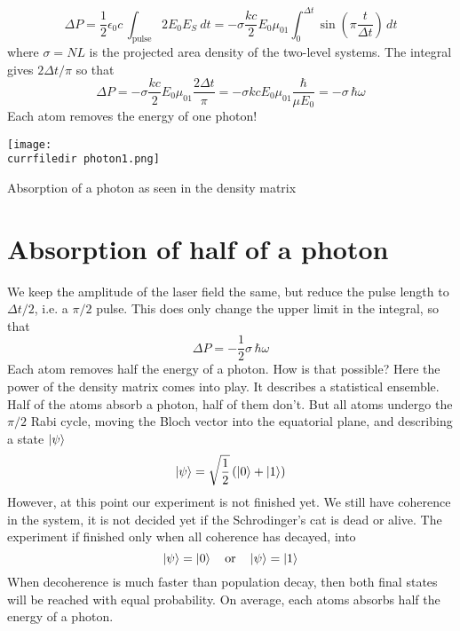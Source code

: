 \begin{equation}
 \Delta P = \frac{1}{2} \epsilon_0 c \,  
\int_\text{pulse} 2 E_0 E_S  \ dt
  =-   \sigma \frac{k c }{2}  E_0 \mu_{01}  \int_0^{\Delta t}   \sin \left( \pi \frac{t}{\Delta t} \right)  \,  dt
\end{equation}
where $\sigma = N L $ is the projected area density of the two-level systems. The integral gives $2 \Delta t/\pi$ so that
\begin{equation}
 \Delta P =-  \sigma \frac{k c}{2}  E_0 \mu_{01} \frac{2 \Delta t}{\pi}
= -  \sigma k c   E_0 \mu_{01}  \frac{\hbar}{\mu E_0} 
= -  \sigma \,  \hbar \omega  
\end{equation}
Each atom removes the energy of one photon!

\begin{marginfigure}
\texttt{[image: \\currfiledir photon1.png]}
\caption{Absorption of a photon as seen in the density matrix}
\end{marginfigure}


\section{Absorption of half of a photon}

We keep the amplitude of the laser field the same, but reduce the pulse length to $\Delta t / 2$, i.e. a $\pi/2$ pulse. This does only change the upper limit in the integral, so that 
\begin{equation}
 \Delta P 
= -  \frac{1}{2} \sigma \,  \hbar \omega  
\end{equation}
Each atom removes half the energy  of a photon. How is that possible?  Here the power of the density matrix comes into play. It describes a statistical ensemble. Half of the atoms absorb a photon, half of them don't. But all atoms undergo the $\pi/2$ Rabi cycle, moving the Bloch vector into the equatorial plane, and describing a state $\ket{\psi}$
\begin{equation}
 \ket{\psi} = \sqrt{\frac{1}{2}} \left( \ket{0} + \ket{1} \right)
\end{equation}
However, at this point our experiment is not finished yet. We still have coherence in the system, it is not decided yet if the Schrodinger's cat is dead or alive. The experiment if finished only when all coherence has decayed, into
\begin{equation}
 \ket{\psi} = \ket{0}  \quad \text{or} \quad \ket{\psi} = \ket{1} 
\end{equation}
When decoherence is much faster than population decay, then both final states will be reached with equal probability. On average, each atoms absorbs half the energy of a photon.

